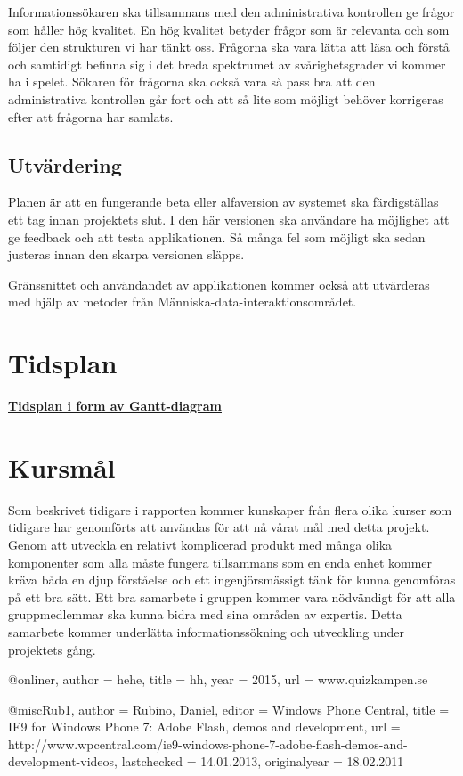 \documentclass[swedish,12pt,a4paper]{article}
\begin{document}
Informationssökaren ska tillsammans med den administrativa kontrollen ge frågor som håller hög kvalitet. En hög kvalitet betyder frågor som är relevanta och som följer den strukturen vi har tänkt oss. Frågorna ska vara lätta att läsa och förstå och samtidigt befinna sig i det breda spektrumet av svårighetsgrader vi kommer ha i spelet. Sökaren för frågorna ska också vara så pass bra att den administrativa kontrollen går fort och att så lite som möjligt behöver korrigeras efter att frågorna har samlats.

\subsection{Utvärdering}
Planen är att en fungerande beta eller alfaversion av systemet ska färdigställas ett tag innan projektets slut. I den här versionen ska användare ha möjlighet att ge feedback och att testa applikationen. Så många fel som möjligt ska sedan justeras innan den skarpa versionen släpps.

Gränssnittet och användandet av applikationen kommer också att utvärderas med hjälp av metoder från Människa-data-interaktionsområdet.
\appendix

\section{Tidsplan}

\textbf{\href{http://www.gantt-chart.com//?td=550c7506aa5a1dd480bd4c8d-845131}{Tidsplan i form av Gantt-diagram}}\\

\section{Kursmål}

Som beskrivet tidigare i rapporten kommer kunskaper från flera olika kurser som tidigare har genomförts att användas för att nå vårat mål med detta projekt. Genom att utveckla en relativt komplicerad produkt med många olika komponenter som alla måste fungera tillsammans som en enda enhet kommer kräva båda en djup förståelse och ett ingenjörsmässigt tänk för kunna genomföras på ett bra sätt.
Ett bra samarbete i gruppen kommer vara nödvändigt för att alla gruppmedlemmar ska kunna bidra med sina områden av expertis. Detta samarbete kommer underlätta informationssökning och utveckling under projektets gång.\\


\begin{thebibliography}{99}

@online{r,
author = {hehe},
title = {hh},
year = {2015},
url = {www.quizkampen.se}
}

@misc{Rub1,
 author = {Rubino, Daniel},
 editor = {{Windows Phone Central}},
 title = {IE9 for Windows Phone 7: Adobe Flash, demos and development},
 url = {http://www.wpcentral.com/ie9-windows-phone-7-adobe-flash-demos-and-development-videos},
 lastchecked = {14.01.2013},
 originalyear = {18.02.2011}
}

\end{thebibliography}


\newpage
\printbibliography[title={Referenser}]
\end{document}
